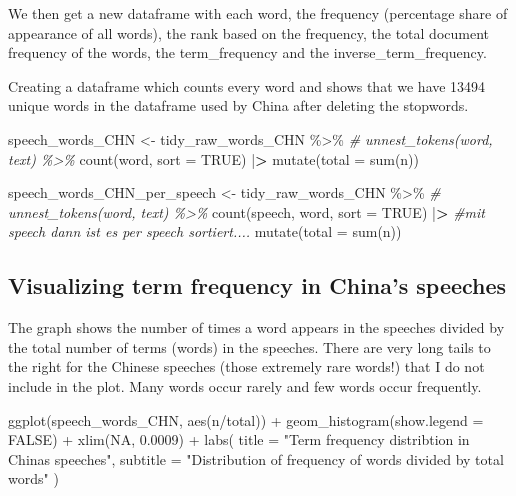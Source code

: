 \documentclass[
]{article}
\newenvironment{Shaded}{\begin{snugshade}}{\end{snugshade}}
\newcommand{\AttributeTok}[1]{\textcolor[rgb]{0.77,0.63,0.00}{#1}}
\newcommand{\CommentTok}[1]{\textcolor[rgb]{0.56,0.35,0.01}{\textit{#1}}}
\newcommand{\ConstantTok}[1]{\textcolor[rgb]{0.00,0.00,0.00}{#1}}
\newcommand{\ErrorTok}[1]{\textcolor[rgb]{0.64,0.00,0.00}{\textbf{#1}}}
\newcommand{\FloatTok}[1]{\textcolor[rgb]{0.00,0.00,0.81}{#1}}
\newcommand{\FunctionTok}[1]{\textcolor[rgb]{0.00,0.00,0.00}{#1}}
\newcommand{\NormalTok}[1]{#1}
\newcommand{\OtherTok}[1]{\textcolor[rgb]{0.56,0.35,0.01}{#1}}
\newcommand{\SpecialCharTok}[1]{\textcolor[rgb]{0.00,0.00,0.00}{#1}}
\newcommand{\StringTok}[1]{\textcolor[rgb]{0.31,0.60,0.02}{#1}}
\begin{document}
We then get a new dataframe with each word, the frequency (percentage
share of appearance of all words), the rank based on the frequency, the
total document frequency of the words, the term\_frequency and the
inverse\_term\_frequency.

Creating a dataframe which counts every word and shows that we have
13494 unique words in the dataframe used by China after deleting the
stopwords.

\begin{Shaded}
\begin{Highlighting}[]
\NormalTok{speech\_words\_CHN }\OtherTok{\textless{}{-}}\NormalTok{ tidy\_raw\_words\_CHN }\SpecialCharTok{\%\textgreater{}\%}
 \CommentTok{\# unnest\_tokens(word, text) \%\textgreater{}\%}
  \FunctionTok{count}\NormalTok{(word, }\AttributeTok{sort =} \ConstantTok{TRUE}\NormalTok{) }\SpecialCharTok{|}\ErrorTok{\textgreater{}} 
    \FunctionTok{mutate}\NormalTok{(}\AttributeTok{total =} \FunctionTok{sum}\NormalTok{(n))}

\NormalTok{speech\_words\_CHN\_per\_speech }\OtherTok{\textless{}{-}}\NormalTok{ tidy\_raw\_words\_CHN }\SpecialCharTok{\%\textgreater{}\%}
 \CommentTok{\# unnest\_tokens(word, text) \%\textgreater{}\%}
  \FunctionTok{count}\NormalTok{(speech, word, }\AttributeTok{sort =} \ConstantTok{TRUE}\NormalTok{) }\SpecialCharTok{|}\ErrorTok{\textgreater{}} \CommentTok{\#mit speech dann ist es per speech sortiert....}
    \FunctionTok{mutate}\NormalTok{(}\AttributeTok{total =} \FunctionTok{sum}\NormalTok{(n))}
\end{Highlighting}
\end{Shaded}

\hypertarget{visualizing-term-frequency-in-chinas-speeches}{%
\subsection{Visualizing term frequency in China's
speeches}\label{visualizing-term-frequency-in-chinas-speeches}}

The graph shows the number of times a word appears in the speeches
divided by the total number of terms (words) in the speeches. There are
very long tails to the right for the Chinese speeches (those extremely
rare words!) that I do not include in the plot. Many words occur rarely
and few words occur frequently.

\begin{Shaded}
\begin{Highlighting}[]
\FunctionTok{ggplot}\NormalTok{(speech\_words\_CHN, }\FunctionTok{aes}\NormalTok{(n}\SpecialCharTok{/}\NormalTok{total)) }\SpecialCharTok{+}
  \FunctionTok{geom\_histogram}\NormalTok{(}\AttributeTok{show.legend =} \ConstantTok{FALSE}\NormalTok{) }\SpecialCharTok{+}
  \FunctionTok{xlim}\NormalTok{(}\ConstantTok{NA}\NormalTok{, }\FloatTok{0.0009}\NormalTok{) }\SpecialCharTok{+}
    \FunctionTok{labs}\NormalTok{(}
        \AttributeTok{title =} \StringTok{"Term frequency distribtion in China\textquotesingle{}s speeches"}\NormalTok{,}
        \AttributeTok{subtitle =} \StringTok{"Distribution of frequency of words divided by total words"}
\NormalTok{    )}
\end{Highlighting}
\end{Shaded}
\end{document}
